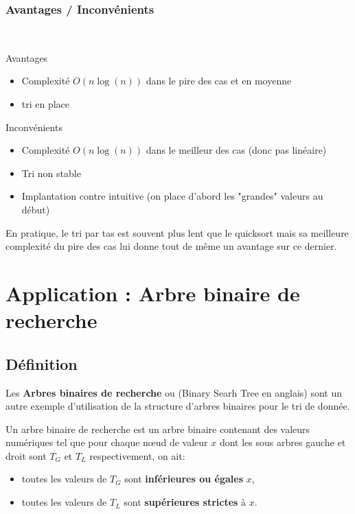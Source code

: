 \documentclass{../cours}
\begin{document}
\subsubsection{Avantages / Inconvénients}

~

\begin{minipage}[t]{0.49 \textwidth}
Avantages

\begin{itemize}
\item Complexité $O(n \log(n))$ dans le pire des cas et en moyenne
\item tri en place
\end{itemize}

\end{minipage}
\begin{minipage}[t]{0.49 \textwidth}
Inconvénients

\begin{itemize}
\item Complexité $O(n \log(n))$ dans le meilleur des cas (donc pas linéaire)
\item Tri non stable
\item Implantation contre intuitive (on place d'abord les "grandes" valeurs au début)
\end{itemize}
\end{minipage}

En pratique, le tri par tas est souvent plus lent que le quicksort mais sa meilleure complexité du pire des cas lui donne tout de même
un avantage sur ce dernier. 

\section{Application : Arbre binaire de recherche}

\subsection{Définition}

Les \textbf{Arbres binaires de recherche} ou (Binary Searh Tree en anglais) sont un autre exemple d'utilisation de la structure d'arbres binaires pour le tri de donnée.

\begin{Definition}
Un arbre binaire de recherche est un arbre binaire contenant des valeurs numériques tel que pour chaque nœud de valeur $x$ dont les sous arbres gauche et droit sont $T_G$ et $T_L$ respectivement, on ait:
\begin{itemize}
\item toutes les valeurs de $T_G$ sont \textbf{inférieures ou égales} $x$,
\item toutes les valeurs de $T_L$ sont \textbf{supérieures strictes} à $x$.
\end{itemize} 
\end{Definition}
\end{document}
